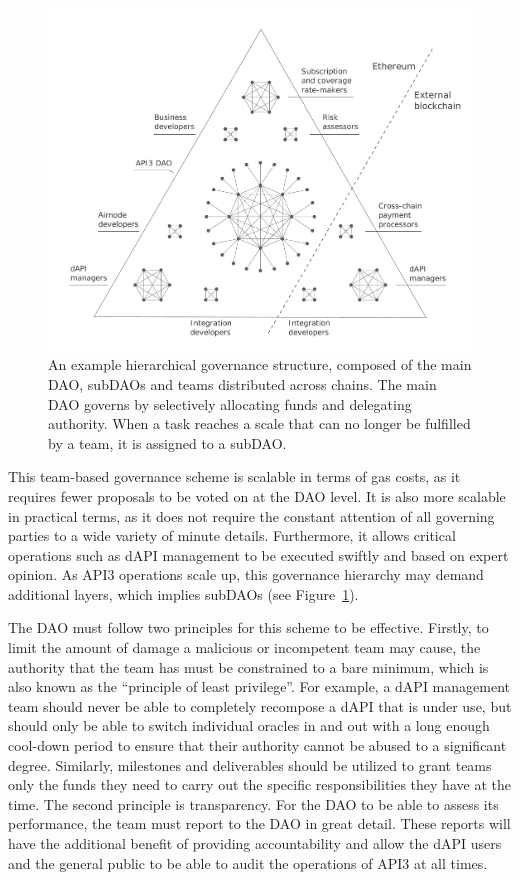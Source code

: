 \documentclass[11pt]{article}
\begin{document}
\begin{figure}[t]
    \centering
	\includegraphics[width=\textwidth]{fig/dao/dao}
	\caption{An example hierarchical governance structure, composed of the main DAO, subDAOs and teams distributed across chains.
	The main DAO governs by selectively allocating funds and delegating authority.
	When a task reaches a scale that can no longer be fulfilled by a team, it is assigned to a subDAO.}
	\label{fig:dao}
\end{figure}

This team-based governance scheme is scalable in terms of gas costs, as it requires fewer proposals to be voted on at the DAO level.
It is also more scalable in practical terms, as it does not require the constant attention of all governing parties to a wide variety of minute details.
Furthermore, it allows critical operations such as dAPI management to be executed swiftly and based on expert opinion.
As API3 operations scale up, this governance hierarchy may demand additional layers, which implies subDAOs (see Figure~\ref{fig:dao}).

The DAO must follow two principles for this scheme to be effective.
Firstly, to limit the amount of damage a malicious or incompetent team may cause, the authority that the team has must be constrained to a bare minimum, which is also known as the ``principle of least privilege''.
For example, a dAPI management team should never be able to completely recompose a dAPI that is under use, but should only be able to switch individual oracles in and out with a long enough cool-down period to ensure that their authority cannot be abused to a significant degree.
Similarly, milestones and deliverables should be utilized to grant teams only the funds they need to carry out the specific responsibilities they have at the time.
The second principle is transparency.
For the DAO to be able to assess its performance, the team must report to the DAO in great detail.
These reports will have the additional benefit of providing accountability and allow the dAPI users and the general public to be able to audit the operations of API3 at all times.
\end{document}
